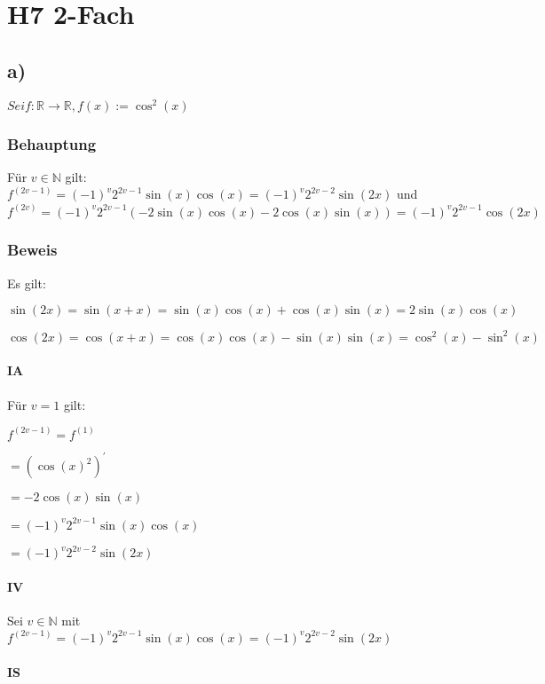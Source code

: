 \section*{H7 2-Fach}

\subsection*{a)}

$Sei f:\mathbb{R}\to\mathbb{R}, f(x) := \cos^{2}(x)$

\subsubsection*{Behauptung}
Für $v \in \mathbb{N}$ gilt:
$f^{(2v-1)} = (-1)^{v} 2^{2v-1} \sin(x)\cos(x) = (-1)^{v} 2^{2v-2} \sin(2x) $ und 
$f^{(2v)} = (-1)^{v} 2^{2v-1}(-2\sin(x)\cos(x)-2\cos(x)\sin(x)) = (-1)^{v} 2^{2v-1}\cos(2x) $

\subsubsection*{Beweis}

Es gilt:

	$\sin(2x) = \sin(x + x) = \sin(x)\cos(x)+\cos(x)\sin(x) = 2\sin(x)\cos(x)$

	$\cos(2x) = \cos(x + x) =\cos(x)\cos(x) - \sin(x)\sin(x) = \cos^{2}(x)-\sin^{2}(x)$

\paragraph*{IA}
Für $v = 1$ gilt: 

$	f^{(2v-1)} = f^{(1)} $

$   = (\cos(x)^{2})^{\prime} $

$	= -2\cos(x)\sin(x) $
	
$	= (-1)^{v} 2^{2v-1} \sin(x)\cos(x) $
	
$	= (-1)^{v} 2^{2v-2} \sin(2x) $

\paragraph*{IV}

Sei $v \in \mathbb{N}$ mit 
$f^{(2v-1)} = (-1)^{v} 2^{2v-1} \sin(x)\cos(x) = (-1)^{v} 2^{2v-2} \sin(2x)$

\paragraph*{IS}

